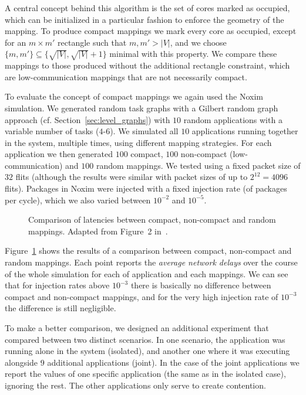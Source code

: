A central concept behind this algorithm is the set of cores marked as occupied, which can be initialized in a particular fashion to enforce the geometry of the mapping.
To produce compact mappings we mark every core as occupied, except for an $m \times m'$ rectangle such that $m,m' > |V|$, and we choose $\{m,m'\} \subseteq \{ \sqrt{|V|}, \sqrt{|V|}+1\}$ minimal with this property.
We compare these mappings to those produced without the additional rectangle constraint, which are low-communication mappings that are not necessarily compact.

To evaluate the concept of compact mappings we again used the Noxim simulation.
We generated random task graphs with a Gilbert random graph approach (cf. Section~\ref{sec:level_graphs}) with $10$ random applications with a variable number of tasks ($4$-$6$).
We simulated all $10$ applications running together in the system, multiple times, using different mapping strategies. 
For each application we then generated $100$ compact, $100$ non-compact (low-communication) and $100$ random mappings. 
We tested using a fixed packet size of $32$ flits (although the results were similar with packet sizes of up to $2^{12} = 4096$ flits).
Packages in Noxim were injected with a fixed injection rate (of packages per cycle), which we also varied between $10^{-2}$ and $10^{-5}$. 

\begin{figure}[h]
	\centering
	\caption{Comparison of latencies between compact, non-compact and random mappings. Adapted from Figure~2 in~\cite{goens_samos19}.}
	\label{fig:compact_latency}
\end{figure}

Figure~\ref{fig:compact_latency} shows the results of a comparison between compact, non-compact and random mappings. 
Each point reports the \emph{average network delays} over the course of the whole simulation for each of application and each mappings. 
We can see that for injection rates above $10^{-3}$ there is basically no difference between compact and non-compact mappings, and for the very high injection rate of $10^{-3}$ the difference is still negligible.

To make a better comparison, we designed an additional experiment that compared between two distinct scenarios.
In one scenario, the application was running alone in the system (isolated), and another one where it was executing alongside $9$ additional applications (joint).
In the case of the joint applications we report the values of one specific application (the same as in the isolated case), ignoring the rest.
The other applications only serve to create contention.

